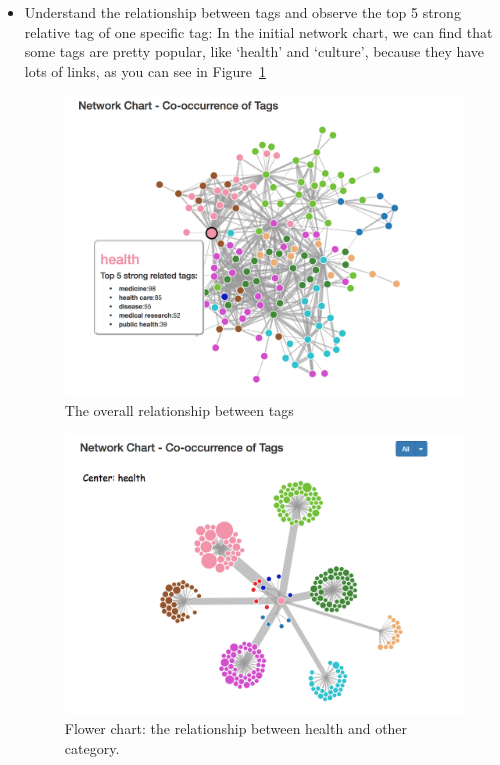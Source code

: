 \documentclass{report}
\numberwithin{figure}{section}
\begin{document}
\begin{itemize}
\item
Understand the relationship between tags and observe the top 5 strong relative tag of one specific tag:
\newline
\quad In the initial network chart, we can find that some tags are pretty popular, like `health' and `culture', because they have lots of links, as you can see in Figure~\ref{fig:health}

\begin{figure}
\begin{center}
\includegraphics[scale=0.3]{health}
\caption{The overall relationship between tags}
\label{fig:health}
\end{center}
\end{figure} 

\begin{figure}
\begin{center}
\includegraphics[scale=0.3]{healthflower}
\caption{Flower chart: the relationship between health and other category.}
\label{fig:healthflower}
\end{center}
\end{figure} 


\end{itemize}
\end{document}
